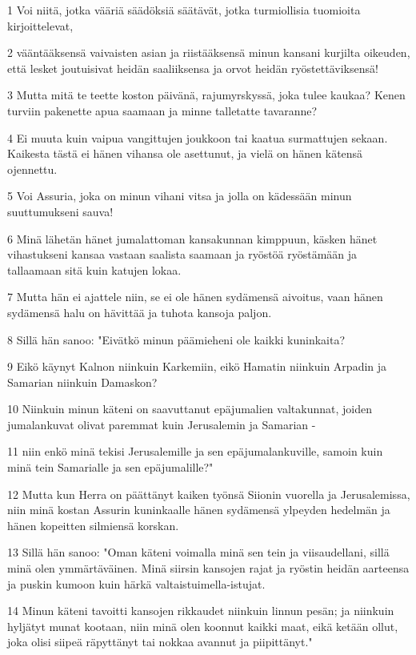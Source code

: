 \par 1 Voi niitä, jotka vääriä säädöksiä säätävät, jotka turmiollisia tuomioita kirjoittelevat,
\par 2 vääntääksensä vaivaisten asian ja riistääksensä minun kansani kurjilta oikeuden, että lesket joutuisivat heidän saaliiksensa ja orvot heidän ryöstettäviksensä!
\par 3 Mutta mitä te teette koston päivänä, rajumyrskyssä, joka tulee kaukaa? Kenen turviin pakenette apua saamaan ja minne talletatte tavaranne?
\par 4 Ei muuta kuin vaipua vangittujen joukkoon tai kaatua surmattujen sekaan. Kaikesta tästä ei hänen vihansa ole asettunut, ja vielä on hänen kätensä ojennettu.
\par 5 Voi Assuria, joka on minun vihani vitsa ja jolla on kädessään minun suuttumukseni sauva!
\par 6 Minä lähetän hänet jumalattoman kansakunnan kimppuun, käsken hänet vihastukseni kansaa vastaan saalista saamaan ja ryöstöä ryöstämään ja tallaamaan sitä kuin katujen lokaa.
\par 7 Mutta hän ei ajattele niin, se ei ole hänen sydämensä aivoitus, vaan hänen sydämensä halu on hävittää ja tuhota kansoja paljon.
\par 8 Sillä hän sanoo: "Eivätkö minun päämieheni ole kaikki kuninkaita?
\par 9 Eikö käynyt Kalnon niinkuin Karkemiin, eikö Hamatin niinkuin Arpadin ja Samarian niinkuin Damaskon?
\par 10 Niinkuin minun käteni on saavuttanut epäjumalien valtakunnat, joiden jumalankuvat olivat paremmat kuin Jerusalemin ja Samarian -
\par 11 niin enkö minä tekisi Jerusalemille ja sen epäjumalankuville, samoin kuin minä tein Samarialle ja sen epäjumalille?"
\par 12 Mutta kun Herra on päättänyt kaiken työnsä Siionin vuorella ja Jerusalemissa, niin minä kostan Assurin kuninkaalle hänen sydämensä ylpeyden hedelmän ja hänen kopeitten silmiensä korskan.
\par 13 Sillä hän sanoo: "Oman käteni voimalla minä sen tein ja viisaudellani, sillä minä olen ymmärtäväinen. Minä siirsin kansojen rajat ja ryöstin heidän aarteensa ja puskin kumoon kuin härkä valtaistuimella-istujat.
\par 14 Minun käteni tavoitti kansojen rikkaudet niinkuin linnun pesän; ja niinkuin hyljätyt munat kootaan, niin minä olen koonnut kaikki maat, eikä ketään ollut, joka olisi siipeä räpyttänyt tai nokkaa avannut ja piipittänyt."
